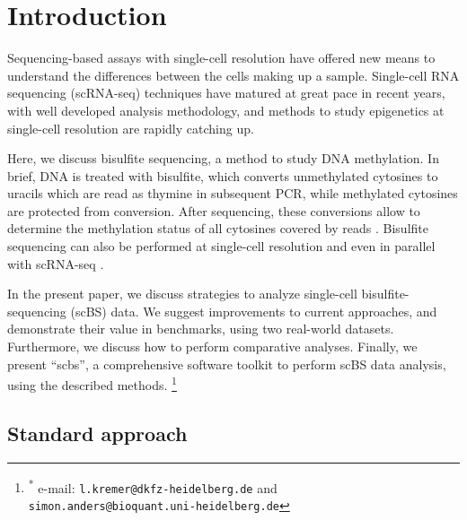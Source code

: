 \documentclass[twocolumn,10pt]{article}
\newcommand\blfootnote[1]{%
    \begingroup
    \renewcommand\thefootnote{}\footnote{#1}%
    \addtocounter{footnote}{-1}%
    \endgroup
}
\begin{document}
\section{Introduction}

Sequencing-based assays with single-cell resolution have offered new means to understand the differences between the cells making up a sample.
Single-cell RNA sequencing (scRNA-seq) techniques have matured at great pace in recent years, with well developed analysis methodology, and methods to study epigenetics at single-cell resolution are rapidly catching up.


Here, we discuss bisulfite sequencing, a method to study DNA methylation.
In brief, DNA is treated with bisulfite, which converts unmethylated cytosines to uracils which are read as thymine in subsequent PCR, while methylated cytosines are protected from conversion.
After sequencing, these conversions allow to determine the methylation status of all cytosines covered by reads \citep{Frommer_1992}.
Bisulfite sequencing can also be performed at single-cell resolution \citep{Smallwood_2014} and even in parallel with scRNA-seq \citep{scMTseq,Clark2018}.

In the present paper, we discuss strategies to analyze single-cell bisulfite-sequencing (scBS) data. We suggest improvements to current approaches, and demonstrate their value in benchmarks, using two real-world datasets. Furthermore, we discuss how to perform comparative analyses. Finally, we present ``scbs'', a comprehensive software toolkit to perform scBS data analysis, using the described methods. 
\blfootnote{\hspace{-.5cm}\raggedright\textsuperscript{*} e-mail:  \texttt{l.kremer@dkfz-heidelberg.de} and\\ \hspace{1cm}\texttt{simon.anders@bioquant.uni-heidelberg.de}}


\subsection{Standard approach}
\end{document}
